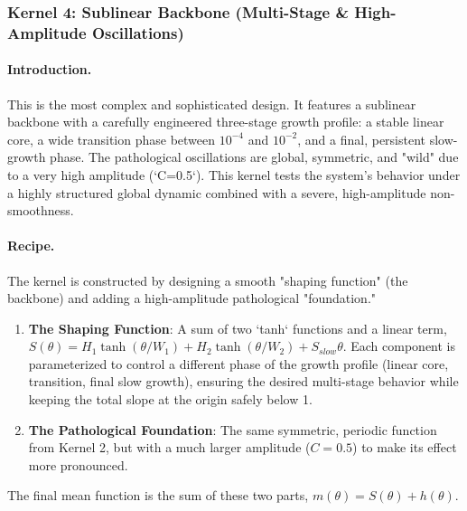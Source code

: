 \documentclass[a4paper]{article}
\begin{document}
\subsubsection*{Kernel 4: Sublinear Backbone (Multi-Stage \& High-Amplitude Oscillations)}
\paragraph{Introduction.}
This is the most complex and sophisticated design. It features a sublinear backbone with a carefully engineered three-stage growth profile: a stable linear core, a wide transition phase between $10^{-4}$ and $10^{-2}$, and a final, persistent slow-growth phase. The pathological oscillations are global, symmetric, and "wild" due to a very high amplitude (`C=0.5`). This kernel tests the system's behavior under a highly structured global dynamic combined with a severe, high-amplitude non-smoothness.

\paragraph{Recipe.}
The kernel is constructed by designing a smooth "shaping function" (the backbone) and adding a high-amplitude pathological "foundation."
\begin{enumerate}
	\item \textbf{The Shaping Function}: A sum of two `tanh` functions and a linear term, $S(\theta) = H_1\tanh(\theta/W_1) + H_2\tanh(\theta/W_2) + S_{slow}\theta$. Each component is parameterized to control a different phase of the growth profile (linear core, transition, final slow growth), ensuring the desired multi-stage behavior while keeping the total slope at the origin safely below 1.
	\item \textbf{The Pathological Foundation}: The same symmetric, periodic function from Kernel 2, but with a much larger amplitude ($C=0.5$) to make its effect more pronounced.
\end{enumerate}
The final mean function is the sum of these two parts, $m(\theta) = S(\theta) + h(\theta)$.
\end{document}

